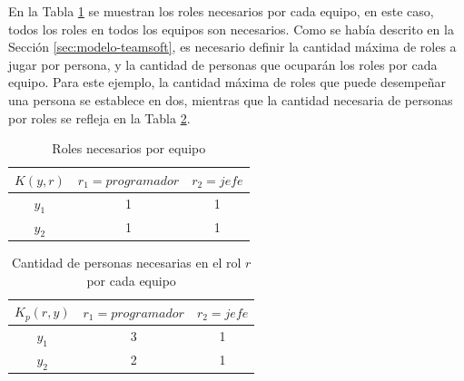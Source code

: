 {\color{red}
En la Tabla \ref{crp-sof} se muestran los roles necesarios por cada equipo, en este caso, todos los roles en todos los equipos son necesarios. Como se había descrito en la Sección \ref{sec:modelo-teamsoft}, es necesario definir la cantidad máxima de roles a jugar por persona, y la cantidad de personas que ocuparán los roles por cada equipo. Para este ejemplo, la cantidad máxima de roles que puede desempeñar una persona se establece en dos, mientras que la cantidad necesaria de personas por roles se refleja en la Tabla \ref{cpnr-sof}. %
}
\begin{table}[H]
  \centering
  \caption{Roles necesarios por equipo}\label{crp-sof}
\begin{tabular}{|c|c|c|}
  \hline
  $K(y,r)$ & $r_1=programador$ & $r_2=jefe$  \\ \hline
  $y_1$ & 1 & 1   \\ \hline
  $y_2$ & 1 & 1   \\ \hline
\end{tabular}
\end{table}




\begin{table}[H]
	\centering
	\caption{Cantidad de personas necesarias en el rol $r$ por cada equipo}\label{cpnr-sof}
	\begin{tabular}{|c|c|c|}
		\hline
		 $K_{p}(r, y)$ & $r_1=programador$ & $r_2=jefe$  \\ \hline
			$y_1$	   & 		3	 	&		1 		 \\ \hline
			$y_2$	   & 		2	 	&		1   	 \\ \hline
	\end{tabular}
\end{table}

